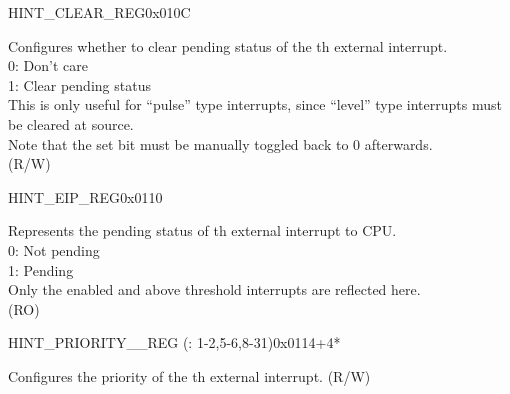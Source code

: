 \begin{register}{H}{INT\_CLEAR\_REG}{0x010C}\label{regdesc:INTCLEARREG}
%
%
%
%
%
%
\regnewline%
\begin{regdesc}
\begin{reglist}
\item [INT\_CLEAR\lbrack\regindex{n}\rbrack] Configures whether to clear pending status of the th external interrupt.\\
0: Don't care\\
1: Clear pending status\\
This is only useful for “pulse” type interrupts, since “level” type interrupts must be cleared at source. \\
Note that the set bit must be manually toggled back to 0 afterwards.\\
(R/W)
\end{reglist}
\end{regdesc}
\end{register}

\begin{register}{H}{INT\_EIP\_REG}{0x0110}\label{regdesc:INTEIPREG}
%
%
%
%
%
%
\regnewline%
\begin{regdesc}
\begin{reglist}
\item [INT\_EIP\lbrack\regindex{n}\rbrack] Represents the pending status of th external interrupt to CPU.\\
0: Not pending\\
1: Pending\\
Only the enabled and above threshold interrupts are reflected here.\\
(RO)
\end{reglist}
\end{regdesc}
\end{register}

\begin{register}{H}{INT\_PRIORITY\_\_REG (: 1-2,5-6,8-31)}{0x0114+4*}\label{regdesc:INTPRIORITYREG}
%
%
\regnewline%
\begin{regdesc}
\begin{reglist}
\label{fielddesc:INTPRIORITY}\item [INT\_PRIORITY\_\regindex{n}] Configures the priority of the th external interrupt. (R/W)
\end{reglist}
\end{regdesc}
\end{register}

